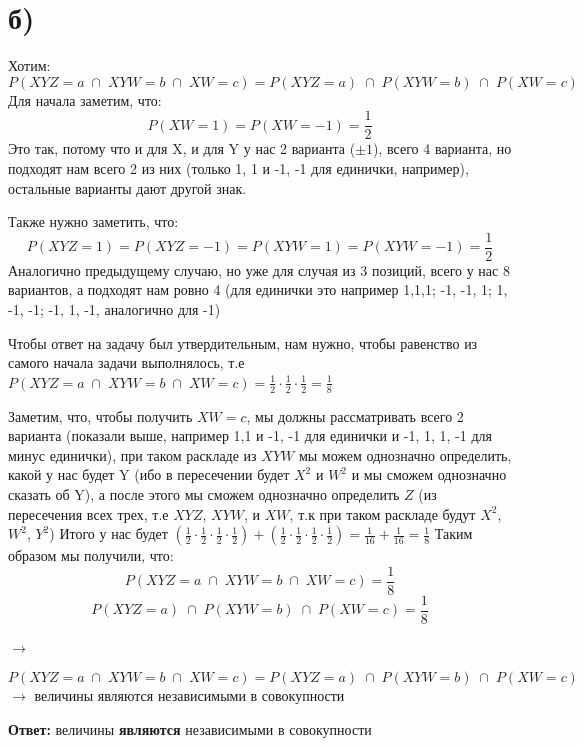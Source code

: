 \documentclass[a4paper,12pt]{article}
\begin{document}
\section*{б)}
Хотим:
\[
P(XYZ = a\; \cap\;XYW = b\; \cap\; XW = c) = P(XYZ = a) \; \cap\; P(XYW = b)\;  \cap\; P(XW = c)
\]
Для начала заметим, что:
\[
P(XW = 1) = P(XW = -1)= \frac{1}{2}
\]
Это так, потому что и для X, и для Y у нас 2 варианта ($\pm 1$), всего 4 варианта, но подходят нам всего 2 из них (только 1, 1 и -1, -1 для единички, например), остальные варианты дают другой знак.


Также нужно заметить, что:
\[
P(XYZ = 1) = P(XYZ = -1) = P(XYW = 1) = P(XYW = -1) = \frac12
\]
Аналогично предыдущему случаю, но уже для случая из 3 позиций, всего у нас 8 вариантов, а подходят нам ровно 4 (для единички это например 1,1,1; -1, -1, 1; 1, -1, -1; -1, 1, -1, аналогично для -1)

Чтобы ответ на задачу был утвердительным, нам нужно, чтобы равенство из самого начала задачи выполнялось, т.е  $P(XYZ = a\; \cap\;XYW = b\; \cap\; XW = c) =  \frac12 \cdot \frac12 \cdot \frac12 = \frac18$

Заметим, что, чтобы получить $XW = c$, мы должны рассматривать всего 2 варианта (показали выше, например 1,1 и -1, -1 для единички и -1, 1, 1, -1 для минус единички), при таком раскладе из $XYW$ мы можем однозначно определить, какой у нас будет Y (ибо в пересечении будет $X^2$ и $W^2$ и мы сможем однозначно сказать об Y), а после этого мы сможем однозначно определить $Z$ (из пересечения всех трех, т.е $XYZ$, $XYW$,  и $XW$, т.к при таком раскладе будут $X^2$, $W^2$, $Y^2$) Итого у нас будет $(\frac12 \cdot \frac12 \cdot \frac12 \cdot \frac12) + (\frac12 \cdot \frac12 \cdot \frac12 \cdot \frac12)= \frac{1}{16} + \frac{1}{16} = \frac18$
Таким образом мы получили, что:
\[
P(XYZ = a\; \cap\;XYW = b\; \cap\; XW = c) =\frac18
\]
\[
 P(XYZ = a) \; \cap\; P(XYW = b)\;  \cap\; P(XW = c) = \frac18
\]
\begin{center}
$\longrightarrow$
\end{center}
\[
P(XYZ = a\; \cap\;XYW = b\; \cap\; XW = c) =  P(XYZ = a) \; \cap\; P(XYW = b)\;  \cap\; P(XW = c)
\]
$\longrightarrow$ величины являются независимыми в совокупности
\begin{center}
\textbf{Ответ: } величины \textbf{являются }независимыми в совокупности
\end{center}
\end{document}
